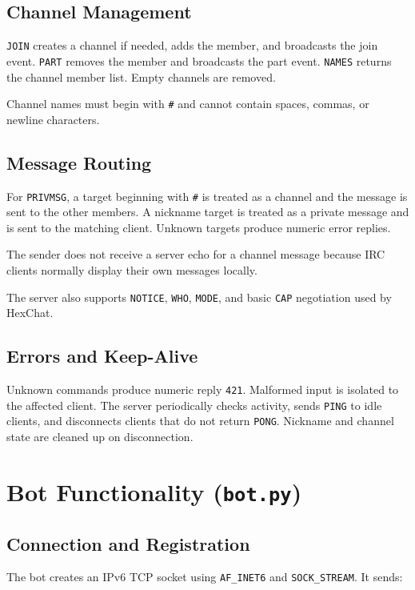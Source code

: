 \documentclass[a4paper,12pt]{article}
\begin{document}
\subsection{Channel Management}

\texttt{JOIN} creates a channel if needed, adds the member, and broadcasts the join event. \texttt{PART} removes the member and broadcasts the part event. \texttt{NAMES} returns the channel member list. Empty channels are removed.

Channel names must begin with \texttt{\#} and cannot contain spaces, commas, or newline characters.

\subsection{Message Routing}

For \texttt{PRIVMSG}, a target beginning with \texttt{\#} is treated as a channel and the message is sent to the other members. A nickname target is treated as a private message and is sent to the matching client. Unknown targets produce numeric error replies.

The sender does not receive a server echo for a channel message because IRC clients normally display their own messages locally.

The server also supports \texttt{NOTICE}, \texttt{WHO}, \texttt{MODE}, and basic \texttt{CAP} negotiation used by HexChat.

\subsection{Errors and Keep-Alive}

Unknown commands produce numeric reply \texttt{421}. Malformed input is isolated to the affected client. The server periodically checks activity, sends \texttt{PING} to idle clients, and disconnects clients that do not return \texttt{PONG}. Nickname and channel state are cleaned up on disconnection.

\section{Bot Functionality (\texttt{bot.py})}

\subsection{Connection and Registration}

The bot creates an IPv6 TCP socket using \texttt{AF\_INET6} and \texttt{SOCK\_STREAM}. It sends:
\end{document}
